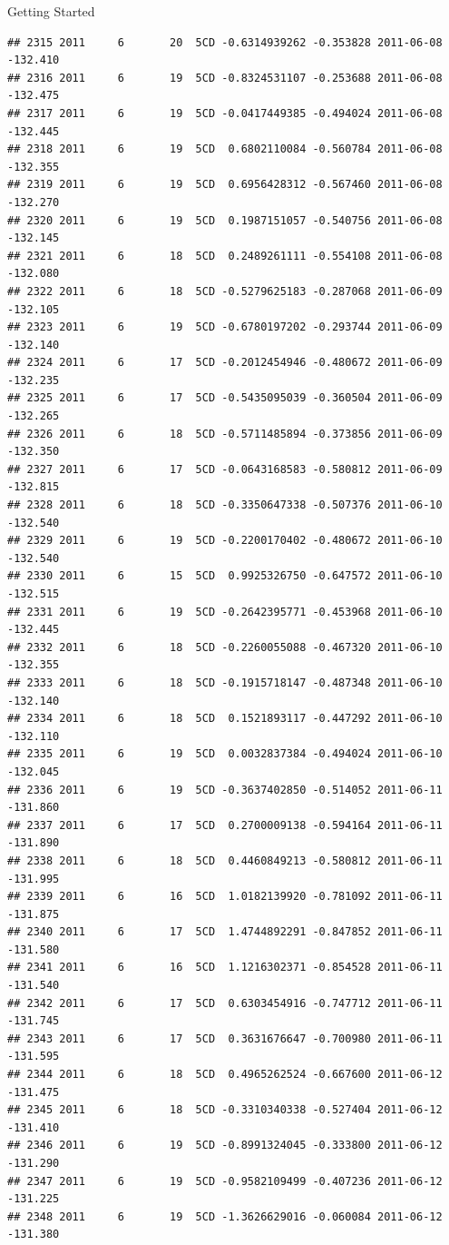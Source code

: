 \documentclass[
  ignorenonframetext,
]{beamer}
\begin{document}
\begin{frame}[fragile]{Getting Started}
\begin{verbatim}
## 2315 2011     6       20  5CD -0.6314939262 -0.353828 2011-06-08 -132.410
## 2316 2011     6       19  5CD -0.8324531107 -0.253688 2011-06-08 -132.475
## 2317 2011     6       19  5CD -0.0417449385 -0.494024 2011-06-08 -132.445
## 2318 2011     6       19  5CD  0.6802110084 -0.560784 2011-06-08 -132.355
## 2319 2011     6       19  5CD  0.6956428312 -0.567460 2011-06-08 -132.270
## 2320 2011     6       19  5CD  0.1987151057 -0.540756 2011-06-08 -132.145
## 2321 2011     6       18  5CD  0.2489261111 -0.554108 2011-06-08 -132.080
## 2322 2011     6       18  5CD -0.5279625183 -0.287068 2011-06-09 -132.105
## 2323 2011     6       19  5CD -0.6780197202 -0.293744 2011-06-09 -132.140
## 2324 2011     6       17  5CD -0.2012454946 -0.480672 2011-06-09 -132.235
## 2325 2011     6       17  5CD -0.5435095039 -0.360504 2011-06-09 -132.265
## 2326 2011     6       18  5CD -0.5711485894 -0.373856 2011-06-09 -132.350
## 2327 2011     6       17  5CD -0.0643168583 -0.580812 2011-06-09 -132.815
## 2328 2011     6       18  5CD -0.3350647338 -0.507376 2011-06-10 -132.540
## 2329 2011     6       19  5CD -0.2200170402 -0.480672 2011-06-10 -132.540
## 2330 2011     6       15  5CD  0.9925326750 -0.647572 2011-06-10 -132.515
## 2331 2011     6       19  5CD -0.2642395771 -0.453968 2011-06-10 -132.445
## 2332 2011     6       18  5CD -0.2260055088 -0.467320 2011-06-10 -132.355
## 2333 2011     6       18  5CD -0.1915718147 -0.487348 2011-06-10 -132.140
## 2334 2011     6       18  5CD  0.1521893117 -0.447292 2011-06-10 -132.110
## 2335 2011     6       19  5CD  0.0032837384 -0.494024 2011-06-10 -132.045
## 2336 2011     6       19  5CD -0.3637402850 -0.514052 2011-06-11 -131.860
## 2337 2011     6       17  5CD  0.2700009138 -0.594164 2011-06-11 -131.890
## 2338 2011     6       18  5CD  0.4460849213 -0.580812 2011-06-11 -131.995
## 2339 2011     6       16  5CD  1.0182139920 -0.781092 2011-06-11 -131.875
## 2340 2011     6       17  5CD  1.4744892291 -0.847852 2011-06-11 -131.580
## 2341 2011     6       16  5CD  1.1216302371 -0.854528 2011-06-11 -131.540
## 2342 2011     6       17  5CD  0.6303454916 -0.747712 2011-06-11 -131.745
## 2343 2011     6       17  5CD  0.3631676647 -0.700980 2011-06-11 -131.595
## 2344 2011     6       18  5CD  0.4965262524 -0.667600 2011-06-12 -131.475
## 2345 2011     6       18  5CD -0.3310340338 -0.527404 2011-06-12 -131.410
## 2346 2011     6       19  5CD -0.8991324045 -0.333800 2011-06-12 -131.290
## 2347 2011     6       19  5CD -0.9582109499 -0.407236 2011-06-12 -131.225
## 2348 2011     6       19  5CD -1.3626629016 -0.060084 2011-06-12 -131.380

\end{verbatim}
\end{frame}
\end{document}
